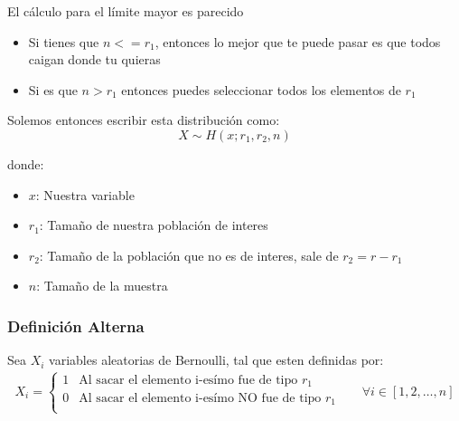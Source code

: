 \documentclass[12pt, fleqn]{report}                             %
\DeclareMathOperator \Space     {\quad}                         %
\theoremstyle{break}                                            %
\begin{document}
                    El cálculo para el límite mayor es parecido
                    \begin{itemize}
                        \item 
                            Si tienes que $n <= r_1$, entonces lo mejor que te puede pasar es que todos
                            caigan donde tu quieras
                        \item
                            Si es que $n > r_1$ entonces puedes seleccionar todos los elementos de $r_1$
                    \end{itemize}

                    \clearpage

                    Solemos entonces escribir esta distribución como:
                    \begin{equation*}
                        X \sim H(x; r_1, r_2, n)
                    \end{equation*}

                    donde:
                    \begin{itemize}
                        \item $x$: Nuestra variable
                        \item $r_1$: Tamaño de nuestra población de interes
                        \item $r_2$: Tamaño de la población que no es de interes, sale de $r_2 = r - r_1$
                        \item $n$: Tamaño de la muestra
                    \end{itemize}


                \vspace{1em}
                \subsubsection{Definición Alterna}

                    Sea $X_i$ variables aleatorias de Bernoulli, tal que esten
                    definidas por: 
                    \begin{align*}
                        X_i = 
                            \begin{cases}
                                1 & \text{Al sacar el elemento i-esímo fue de tipo $r_1$}        \\
                                0 & \text{Al sacar el elemento i-esímo NO fue de tipo $r_1$}     \\
                            \end{cases}
                            \Space
                            \forall i \in [1, 2, \dots, n]
                    \end{align*}
\end{document}
